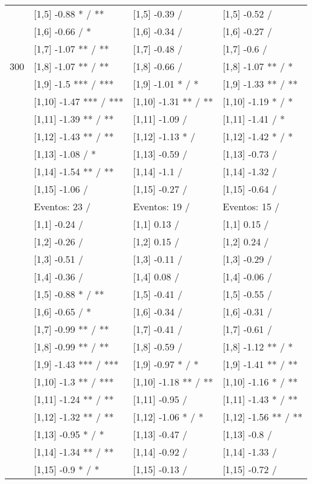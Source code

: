 \begin{table}
\begin{tabular}[t]{llll}
 & {}[1,5] -0.88 * / ** & {}[1,5] -0.39  / & {}[1,5] -0.52  /\\
 & {}[1,6] -0.66  / * & {}[1,6] -0.34  / & {}[1,6] -0.27  /\\
 & {}[1,7] -1.07 ** / ** & {}[1,7] -0.48  / & {}[1,7] -0.6  /\\
300 & {}[1,8] -1.07 ** / ** & {}[1,8] -0.66  / & {}[1,8] -1.07 ** / *\\
\addlinespace
 & {}[1,9] -1.5 *** / *** & {}[1,9] -1.01 * / * & {}[1,9] -1.33 ** / **\\
 & {}[1,10] -1.47 *** / *** & {}[1,10] -1.31 ** / ** & {}[1,10] -1.19 * / *\\
 & {}[1,11] -1.39 ** / ** & {}[1,11] -1.09  / & {}[1,11] -1.41  / *\\
 & {}[1,12] -1.43 ** / ** & {}[1,12] -1.13 * / & {}[1,12] -1.42 * / *\\
 & {}[1,13] -1.08  / * & {}[1,13] -0.59  / & {}[1,13] -0.73  /\\
\addlinespace
 & {}[1,14] -1.54 ** / ** & {}[1,14] -1.1  / & {}[1,14] -1.32  /\\
 & {}[1,15] -1.06  / & {}[1,15] -0.27  / & {}[1,15] -0.64  /\\
 & Eventos:  23 / & Eventos:  19 / & Eventos:  15 /\\
 & {}[1,1] -0.24  / & {}[1,1] 0.13  / & {}[1,1] 0.15  /\\
 & {}[1,2] -0.26  / & {}[1,2] 0.15  / & {}[1,2] 0.24  /\\
\addlinespace
 & {}[1,3] -0.51  / & {}[1,3] -0.11  / & {}[1,3] -0.29  /\\
 & {}[1,4] -0.36  / & {}[1,4] 0.08  / & {}[1,4] -0.06  /\\
 & {}[1,5] -0.88 * / ** & {}[1,5] -0.41  / & {}[1,5] -0.55  /\\
 & {}[1,6] -0.65  / * & {}[1,6] -0.34  / & {}[1,6] -0.31  /\\
 & {}[1,7] -0.99 ** / ** & {}[1,7] -0.41  / & {}[1,7] -0.61  /\\
\addlinespace
500 & {}[1,8] -0.99 ** / ** & {}[1,8] -0.59  / & {}[1,8] -1.12 ** / *\\
 & {}[1,9] -1.43 *** / *** & {}[1,9] -0.97 * / * & {}[1,9] -1.41 ** / **\\
 & {}[1,10] -1.3 ** / *** & {}[1,10] -1.18 ** / ** & {}[1,10] -1.16 * / **\\
 & {}[1,11] -1.24 ** / ** & {}[1,11] -0.95  / & {}[1,11] -1.43 * / **\\
 & {}[1,12] -1.32 ** / ** & {}[1,12] -1.06 * / * & {}[1,12] -1.56 ** / **\\
\addlinespace
 & {}[1,13] -0.95 * / * & {}[1,13] -0.47  / & {}[1,13] -0.8  /\\
 & {}[1,14] -1.34 ** / ** & {}[1,14] -0.92  / & {}[1,14] -1.33  /\\
 & {}[1,15] -0.9 * / * & {}[1,15] -0.13  / & {}[1,15] -0.72  /\\
\bottomrule
\end{tabular}
\end{table}
